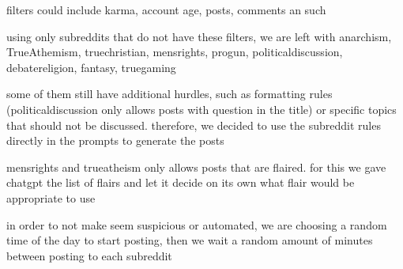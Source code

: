filters could include karma, account age, posts, comments an such

using only subreddits that do not have these filters, we are left with anarchism, TrueAthemism, truechristian, mensrights, progun, politicaldiscussion, debatereligion, fantasy, truegaming

some of them still have additional hurdles, such as formatting rules (politicaldiscussion only allows posts with question in the title) or specific topics that should not be discussed. therefore, we decided to use the subreddit rules directly in the prompts to generate the posts

mensrights and trueatheism only allows posts that are flaired. for this we gave chatgpt the list of flairs and let it decide on its own what flair would be appropriate to use

in order to not make seem suspicious or automated, we are choosing a random time of the day to start posting, then we wait a random amount of minutes between posting to each subreddit





